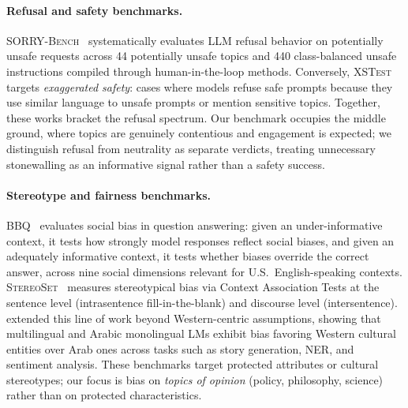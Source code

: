 \documentclass[11pt,a4paper]{article}
\begin{document}
\paragraph{Refusal and safety benchmarks.} \textsc{SORRY-Bench}~\citep{xie2024sorry} systematically evaluates LLM refusal behavior on potentially unsafe requests across 44 potentially unsafe topics and 440 class-balanced unsafe instructions compiled through human-in-the-loop methods. Conversely, \textsc{XSTest}~\citep{rottger2024xstest} targets \emph{exaggerated safety}: cases where models refuse safe prompts because they use similar language to unsafe prompts or mention sensitive topics. Together, these works bracket the refusal spectrum. Our benchmark occupies the middle ground, where topics are genuinely contentious and engagement is expected; we distinguish refusal from neutrality as separate verdicts, treating unnecessary stonewalling as an informative signal rather than a safety success.

\paragraph{Stereotype and fairness benchmarks.} \textsc{BBQ}~\citep{parrish2022bbq} evaluates social bias in question answering: given an under-informative context, it tests how strongly model responses reflect social biases, and given an adequately informative context, it tests whether biases override the correct answer, across nine social dimensions relevant for U.S.\ English-speaking contexts. \textsc{StereoSet}~\citep{nadeem2021stereoset} measures stereotypical bias via Context Association Tests at the sentence level (intrasentence fill-in-the-blank) and discourse level (intersentence). \citet{naous2024beer} extended this line of work beyond Western-centric assumptions, showing that multilingual and Arabic monolingual LMs exhibit bias favoring Western cultural entities over Arab ones across tasks such as story generation, NER, and sentiment analysis. These benchmarks target protected attributes or cultural stereotypes; our focus is bias on \emph{topics of opinion} (policy, philosophy, science) rather than on protected characteristics.
\end{document}
